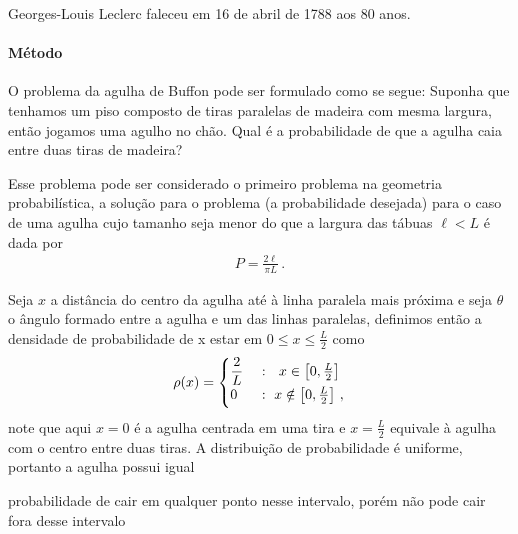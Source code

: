 \documentclass[18pt]{article}
\begin{document}
Georges-Louis Leclerc faleceu em 16 de abril de 1788 aos 80 anos.

\paragraph{Método}

O problema da agulha de Buffon pode ser formulado como se segue: Suponha que tenhamos um piso composto de tiras paralelas de madeira com mesma largura, então jogamos uma agulho no chão. Qual é a probabilidade de que a agulha caia entre duas tiras de madeira?

Esse problema pode ser considerado o primeiro problema na geometria probabilística, a solução para o problema (a probabilidade desejada) para o caso de uma agulha cujo tamanho seja menor do que a largura das tábuas $\ell<L$ é dada por
\begin{align}
P=\frac{2\ell}{\pi L}\,.
\end{align}

Seja $x$ a distância do centro da agulha até à linha paralela mais próxima e seja $\theta$ o ângulo formado entre a agulha e um das linhas paralelas, definimos então a densidade de probabilidade de x estar em $0\leq x\leq \frac{L}{2}$ como
\begin{align}
\rho(x)=\begin{cases}
\dfrac{2}{L}~&:~~ x\in\left[0, \frac{L}{2}\right]\\
\vspace{.1cm}
0~&:~x\notin \left[0, \frac{L}{2}\right]\,,
\end{cases}
\end{align}
note que aqui $x=0$ é a agulha centrada em uma tira e $x=\frac{L}{2}$ equivale à agulha com o centro entre duas tiras. A distribuição de probabilidade é uniforme, portanto a agulha possui igual 

probabilidade de cair em qualquer ponto nesse intervalo, porém não pode cair fora desse intervalo
\end{document}
